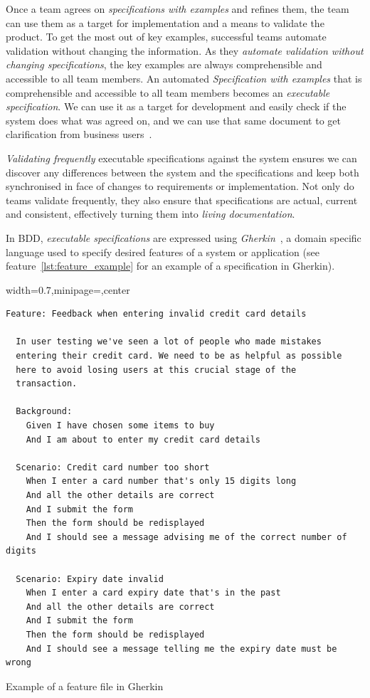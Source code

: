\documentclass[dissertation,final]{softeng}
\newenvironment{featurecode}[1]
{ \lrbox\featurebox \begin{adjustbox}{width=#1\textwidth,minipage=\textwidth,center} }
{ \end{adjustbox}\endlrbox}
\newenvironment{featurelist}[2]
{
\newcommand{\setcaption}{\caption{#1}}
\newcommand{\setlabel}{\label{#2}}
}
{\begin{listing}[h!]\centering\usebox\featurebox\setcaption\setlabel\end{listing}}
\begin{document}
Once a team agrees on \emph{specifications with examples} and refines them, the team can use them as a target for implementation and a means to validate the product. To get the most out of key examples, successful teams automate validation without changing the information. As they\emph{ automate validation without changing specifications}, the key examples are always comprehensible and accessible to all team members. An automated \emph{Specification with examples} that is comprehensible and accessible to all team members becomes an \emph{executable specification}. We can use it as a target for development and easily check if the system does what was agreed on, and we can use that same document to get clarification from business users~\citep{Adzic201106}.

\emph{Validating frequently} executable specifications against the system ensures we can discover any differences between the system and the specifications and keep both synchronised in face of changes to requirements or implementation. Not only do teams validate frequently, they also ensure that specifications are actual, current and consistent, effectively turning them into \emph{living documentation}.

In BDD, \emph{executable specifications} are expressed using \emph{Gherkin}~\citep{wynne2012cucumber}, a domain specific language used to specify desired features of a system or application (see feature~\ref{lst:feature_example} for an example of a specification in Gherkin). 

\begin{featurelist}{Example of a feature file in Gherkin~\citep{wynne2012cucumber}}{lst:feature_example}
\begin{featurecode}{0.7}
\begin{verbatim}
Feature: Feedback when entering invalid credit card details

  In user testing we've seen a lot of people who made mistakes
  entering their credit card. We need to be as helpful as possible
  here to avoid losing users at this crucial stage of the
  transaction.

  Background:
    Given I have chosen some items to buy
    And I am about to enter my credit card details

  Scenario: Credit card number too short
    When I enter a card number that's only 15 digits long
    And all the other details are correct
    And I submit the form
    Then the form should be redisplayed
    And I should see a message advising me of the correct number of digits

  Scenario: Expiry date invalid
    When I enter a card expiry date that's in the past
    And all the other details are correct
    And I submit the form
    Then the form should be redisplayed
    And I should see a message telling me the expiry date must be wrong
\end{verbatim}
\end{featurecode}
\end{featurelist}
\end{document}
